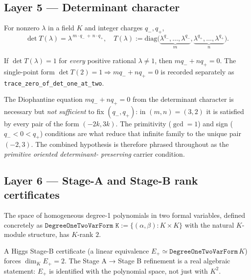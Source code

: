 \subsection*{Layer 5 --- Determinant character}

\begin{theorem}
For nonzero $\lambda$ in a field $K$ and integer charges $q_-, q_+$,
\[
\det T(\lambda)
= \lambda^{\,m \cdot q_- \,+\, n \cdot q_+},
\quad
T(\lambda) :=
\mathrm{diag}\bigl(
\underbrace{\lambda^{q_-},\ldots,\lambda^{q_-}}_{m},
\underbrace{\lambda^{q_+},\ldots,\lambda^{q_+}}_{n}
\bigr).
\]
\end{theorem}

\begin{corollary}
If $\det T(\lambda) = 1$ for \emph{every} positive rational
$\lambda \neq 1$, then $m q_- + n q_+ = 0$. The single-point form
$\det T(2) = 1 \Rightarrow m q_- + n q_+ = 0$ is recorded
separately as \texttt{trace\_zero\_of\_det\_one\_at\_two}.
\end{corollary}

\begin{remark}
The Diophantine equation $m q_- + n q_+ = 0$ from the determinant
character is necessary but \emph{not sufficient} to fix $(q_-,
q_+)$: in $(m,n)=(3,2)$ it is satisfied by every pair of the form
$(-2 k, 3 k)$. The primitivity ($\gcd = 1$) and sign ($q_- <
0 < q_+$) conditions are what reduce that infinite family to the
unique pair $(-2, 3)$. The combined hypothesis is therefore
phrased throughout as the \emph{primitive oriented determinant-
preserving} carrier condition.
\end{remark}

\subsection*{Layer 6 --- Stage-A and Stage-B rank certificates}

\begin{theorem}
The space of homogeneous degree-1 polynomials in two formal
variables, defined concretely as
$\texttt{DegreeOneTwoVarForm K} := \{(\alpha, \beta) : K \times K\}$
with the natural $K$-module structure, has $K$-rank $2$.
\end{theorem}

\begin{theorem}
A Higgs Stage-B certificate (a linear equivalence
$E_+ \simeq \texttt{DegreeOneTwoVarForm}\,K$) forces
$\dim_K E_+ = 2$. The Stage A → Stage B refinement is a real
algebraic statement: $E_+$ is identified with the polynomial
space, not just with $K^2$.
\end{theorem}


